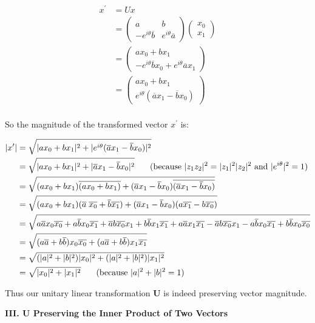 \documentclass{article}
\begin{document}
\begin{align*}
x^{\prime}
&= U x\\
&= \begin{pmatrix}
   a & b\\
   -e^{i\theta}\overline{b} & e^{i\theta}\overline{a}
\end{pmatrix}
\begin{pmatrix} x_0\\x_1\end{pmatrix}\\
&= \begin{pmatrix}
   ax_0 + bx_1\\
   -e^{i\theta}\overline{b} x_0 +  e^{i\theta}\overline{a} x_1
\end{pmatrix}\\
&= \begin{pmatrix}
   ax_0 + bx_1\\
   e^{i\theta}(
   \overline{a} x_1 - \overline{b} x_0)
\end{pmatrix}\\
\end{align*}

So the magnitude of the transformed vector $x^{\prime}$ is:

\begin{align*}
|x^{\prime}| &=
\sqrt{|ax_0+bx_1|^2 + |e^{i\theta}(\overline{a}x_1-\overline{b}x_0)|^2}\\
&=
\sqrt{|ax_0+bx_1|^2 + |\overline{a}x_1-\overline{b}x_0|^2}
\hspace{0.25in}(\text{because }|z_1 z_2|^2 = |z_1|^2 |z_2|^2 \text{ and } |e^{i\theta}|^2 = 1) \\
&=
\sqrt{(ax_0+bx_1)\overline{(ax_0+bx_1)} + (\overline{a}x_1-\overline{b}x_0)\overline{(\overline{a}x_1-\overline{b}x_0)}}\\
&=
\sqrt{(ax_0+bx_1)(\overline{a}\;\overline{x_0}+\overline{b}\overline{x_1}) + (\overline{a}x_1-\overline{b}x_0)(a\overline{x_1} - b\overline{x_0})}\\
&=
\sqrt{
  a \overline{a} x_0\overline{x_0} +
  a \overline{b} x_0 \overline{x_1} +
  \overline{a} b \overline{x_0} x_1 +
  b \overline{b} x_1 \overline{x_1} +
  a \overline{a} x_1 \overline{x_1} -
  \overline{a} b \overline{x_0} x_1 -
  a \overline{b} x_0 \overline{x_1} +
  b \overline{b} x_0 \overline{x_0}
}\\
&=
\sqrt{
  (a \overline{a} + b \overline{b}) x_0\overline{x_0} +
  (a \overline{a} + b \overline{b}) x_1 \overline{x_1}
}\\
&=
\sqrt{
  (|a|^2 + |b|^2) |x_0|^2 +
  (|a|^2 + |b|^2) |x_1|^2
}\\
&= \sqrt{|x_0|^2 + |x_1|^2}
\hspace{0.25in}(\text{because } |a|^2 + |b|^2 = 1)
\end{align*}

Thus our unitary linear transformation \textbf{U} is indeed preserving vector magnitude.

\vspace{0.25in}

\textbf{III. U Preserving the Inner Product of Two Vectors}\par

\vspace{0.125in}



% 


\end{document}
